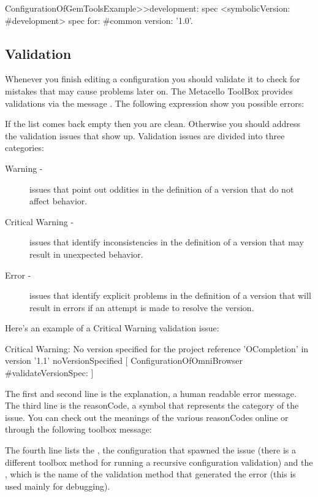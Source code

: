 \documentclass[a4paper,10pt,twoside]{book}
\begin{document}
\begin{code}{}
ConfigurationOfGemToolsExample>>development: spec
  <symbolicVersion: #development>
  spec for: #common version: '1.0'.
\end{code}


\subsection{Validation}

Whenever you finish editing a configuration you should validate it to check for mistakes that may cause problems later on. The Metacello ToolBox provides validations via the message . The following expression show you possible errors: 

If the list comes back empty then you are clean. Otherwise you should address the validation issues that show up. Validation issues are divided into three categories:

\begin{description}
\item[Warning -] issues that point out oddities in the definition of a version that do not affect behavior.
\item[Critical Warning -] issues that identify inconsistencies in the definition of a version that may result in unexpected behavior.
\item[ Error -] issues that identify explicit problems in the definition of a version that will result in errors if an attempt is made to resolve the version.
\end{description}

Here's an example of a Critical Warning validation issue:
\begin{code}{}
Critical Warning: No version specified for the project reference 'OCompletion'
                in version '1.1'
     { noVersionSpecified }
     [ ConfigurationOfOmniBrowser #validateVersionSpec: ]
\end{code}     

The first and second line is the explanation, a human readable error message. The third line is the reasonCode, a symbol that represents the category of the issue. You can check out the meanings of the various reasonCodes online or through the following toolbox message:

The fourth line lists the , \ie the configuration that spawned the issue (there is a different toolbox method for running a recursive configuration validation) and the , which is the name of the validation method that generated the error (this is used mainly for debugging).
\end{document}
